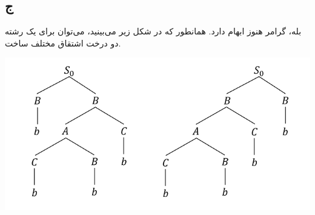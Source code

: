 \subsection*{ج}
بله، گرامر هنوز ابهام دارد. همانطور که در شکل زیر می‌بینید، می‌توان برای یک رشته دو درخت اشتقاق مختلف ساخت.

\begin{center}
	\includegraphics{image2}
\end{center}